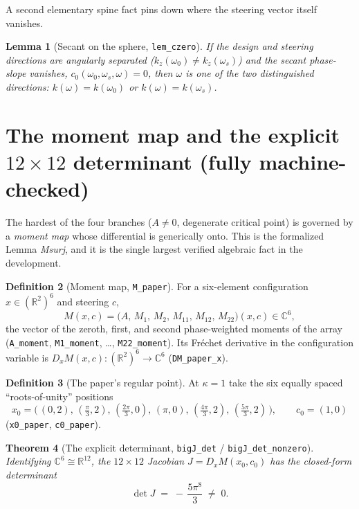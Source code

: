 \documentclass[11pt]{article}
\theoremstyle{plain}
\newtheorem{theorem}{Theorem}[section]
\newtheorem{lemma}[theorem]{Lemma}
\theoremstyle{definition}
\newtheorem{definition}[theorem]{Definition}
\theoremstyle{remark}
\newcommand{\RR}{\mathbb{R}}
\newcommand{\CC}{\mathbb{C}}
\newcommand{\cvec}{c}                 %
\newcommand{\Af}{A}                   %
\newcommand{\code}[1]{\texttt{\small #1}}
\begin{document}
A second elementary spine fact pins down where the steering vector itself
vanishes.

\begin{lemma}[Secant on the sphere, \code{lem\_czero}]
If the design and steering directions are angularly separated
($k_z(\omega_0)\ne k_z(\omega_s)$) and the secant phase-slope vanishes,
$\cvec_0(\omega_0,\omega_s,\omega)=0$, then $\omega$ is one of the two
distinguished directions: $k(\omega)=k(\omega_0)$ or $k(\omega)=k(\omega_s)$.
\end{lemma}

\section{The moment map and the explicit \texorpdfstring{$12\times12$}{12x12}
  determinant (fully machine-checked)}\label{sec:moment}

The hardest of the four branches ($\Af\ne0$, degenerate critical point) is
governed by a \emph{moment map} whose differential is generically onto.  This is
the formalized Lemma \emph{Msurj}, and it is the single largest verified algebraic
fact in the development.

\begin{definition}[Moment map, \code{M\_paper}]
For a six-element configuration $x\in(\RR^2)^6$ and steering $c$,
\[
  M(x,c)=\big(A,\,M_1,\,M_2,\,M_{11},\,M_{12},\,M_{22}\big)(x,c)\in\CC^6,
\]
the vector of the zeroth, first, and second phase-weighted moments of the array
(\code{A\_moment}, \code{M1\_moment}, \dots, \code{M22\_moment}).  Its Fréchet
derivative in the configuration variable is $D_xM(x,c):(\RR^2)^6\to\CC^6$
(\code{DM\_paper\_x}).
\end{definition}

\begin{definition}[The paper's regular point]
At $\kappa=1$ take the six equally spaced ``roots-of-unity'' positions
\[
  x_0=\Big(\,(0,2),\,(\tfrac\pi3,2),\,(\tfrac{2\pi}3,0),\,(\pi,0),\,
       (\tfrac{4\pi}3,2),\,(\tfrac{5\pi}3,2)\,\Big),\qquad
  c_0=(1,0)
\]
(\code{x0\_paper}, \code{c0\_paper}).
\end{definition}

\begin{theorem}[The explicit determinant, \code{bigJ\_det} / \code{bigJ\_det\_nonzero}]
\label{thm:det}
Identifying $\CC^6\cong\RR^{12}$, the $12\times12$ Jacobian
$J=D_xM(x_0,c_0)$ has the closed-form determinant
\[
  \det J \;=\; -\,\frac{5\pi^8}{3}\;\ne\;0 .
\]
\end{theorem}
\end{document}
